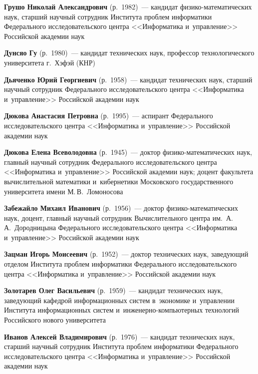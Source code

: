 \begin{multicols}{2}
\noindent
\textbf{Грушо Николай Александрович} (р.\ 1982)~--- кандидат фи\-зи\-ко-ма\-те\-ма\-ти\-че\-ских наук, 
старший научный со\-труд\-ник Института проб\-лем информатики Федерального исследовательского цент\-ра 
<<Информатика и~управ\-ле\-ние>> Российской академии наук

\noindent
\textbf{Дунсяо Гу} (р.\ 1980)~--- кандидат технических наук, профессор технологического университета г.~Хэфэй (КНР)

\noindent
\textbf{Дьяченко Юрий Георгиевич} (р.\ 1958)~--- кандидат технических наук, старший научный сотрудник Федерального исследовательского цент\-ра 
<<Информатика и~управ\-ле\-ние>> Российской академии наук

\noindent
\textbf{Дюкова Анастасия Петровна} (р.\ 1995)~--- 
аспирант Федерального исследовательского цент\-ра <<Информатика и~управ\-ле\-ние>> Российской академии наук 

\noindent
\textbf{Дюкова Елена Всеволодовна} (р.\ 1945)~--- доктор фи\-зи\-ко-ма\-те\-ма\-ти\-че\-ских наук, 
главный научный сотрудник Федерального исследовательского цент\-ра <<Информатика и~управ\-ле\-ние>>
 Российской академии наук; доцент факультета вы\-чис\-ли\-тель\-ной математики и~кибернетики Московского государственного университета 
 имени М.\,В.~Ломоносова

\noindent
\textbf{Забежайло Михаил Иванович} (р.\ 1956)~--- доктор фи\-зи\-ко-ма\-те\-ма\-ти\-че\-ских наук, 
доцент, главный научный сотрудник Вы\-чис\-ли\-тель\-но\-го цент\-ра им.\ А.\,А.~Дородницына Федерального исследовательского 
цент\-ра <<Информатика и~управ\-ле\-ние>> Российской академии наук

\noindent
\textbf{Зацман Игорь Моисеевич} (р.\ 1952)~--- доктор технических наук, 
заведующий отделом Института проб\-лем информатики Федерального исследовательского цент\-ра <<Информатика и~управ\-ле\-ние>>
 \mbox{Российской} академии наук
 
\noindent
\textbf{Золотарев Олег Васильевич} (р.\ 1959)~--- 
кандидат \linebreak технических наук, за\-ве\-ду\-ющий ка\-фед\-рой информационных сис\-тем в~экономике и~управ\-ле\-нии Института информационных сис\-тем 
и~ин\-же\-нер\-но-компью\-тер\-ных технологий Российского нового университета
 
\noindent
\textbf{Иванов Алексей Владимирович} (р.\ 1976)~--- 
кандидат технических наук, старший научный сотрудник Института проб\-лем информатики Федерального исследовательского цент\-ра 
<<Информатика и~управ\-ле\-ние>> Российской академии наук


\end{multicols}
